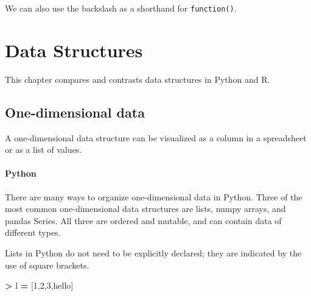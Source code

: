 \documentclass[
]{book}
\newenvironment{Shaded}{\begin{snugshade}}{\end{snugshade}}
\newcommand{\DecValTok}[1]{\textcolor[rgb]{0.00,0.00,0.81}{#1}}
\newcommand{\FloatTok}[1]{\textcolor[rgb]{0.00,0.00,0.81}{#1}}
\newcommand{\FunctionTok}[1]{\textcolor[rgb]{0.00,0.00,0.00}{#1}}
\newcommand{\NormalTok}[1]{#1}
\newcommand{\OperatorTok}[1]{\textcolor[rgb]{0.81,0.36,0.00}{\textbf{#1}}}
\newcommand{\SpecialCharTok}[1]{\textcolor[rgb]{0.00,0.00,0.00}{#1}}
\newcommand{\StringTok}[1]{\textcolor[rgb]{0.31,0.60,0.02}{#1}}
\begin{document}
We can also use the backslash as a shorthand for \texttt{function()}.

\begin{Shaded}
\end{Shaded}

\hypertarget{data-structures}{%
\chapter{Data Structures}\label{data-structures}}

This chapter compares and contrasts data structures in Python and R.

\hypertarget{one-dimensional-data}{%
\section{One-dimensional data}\label{one-dimensional-data}}

A one-dimensional data structure can be visualized as a column in a spreadsheet or as a list of values.

\hypertarget{python-8}{%
\subsubsection*{Python}\label{python-8}}

There are many ways to organize one-dimensional data in Python. Three of the most common one-dimensional data structures are lists, numpy arrays, and pandas Series. All three are ordered and mutable, and can contain data of different types.

Lists in Python do not need to be explicitly declared; they are indicated by the use of square brackets.

\begin{Shaded}
\begin{Highlighting}[]
\OperatorTok{\textgreater{}}\NormalTok{ l }\OperatorTok{=}\NormalTok{ [}\DecValTok{1}\NormalTok{,}\DecValTok{2}\NormalTok{,}\DecValTok{3}\NormalTok{,}\StringTok{\textquotesingle{}hello\textquotesingle{}}\NormalTok{]}
\end{Highlighting}
\end{Shaded}
\end{document}
